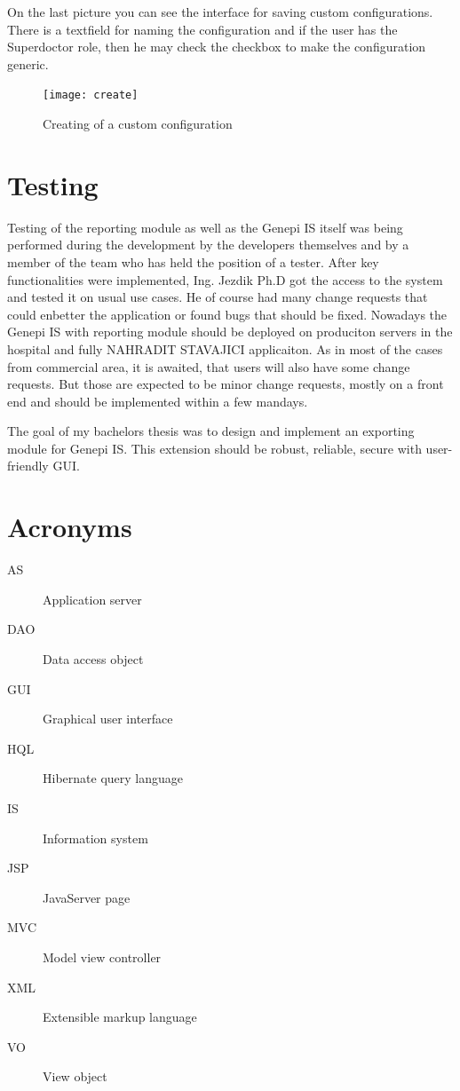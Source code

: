 \documentclass[thesis=B,english]{FITthesis}[2012/10/20]
\begin{document}
On the last picture you can see the interface for saving custom configurations. There is a textfield for naming the configuration and if the user has the Superdoctor role, then he may check the checkbox to make the configuration generic.


\begin{figure}[ht]\centering
\texttt{[image: create]}
		\caption{Creating of a custom configuration}
\end{figure}

\chapter{Testing}
Testing of the reporting module as well as the Genepi IS itself was being performed during the development by the developers themselves and by a member of the team who has held the position of a tester. After key  functionalities were implemented, Ing. Jezdik Ph.D got the access to the system and tested it on usual use cases. He of course had many change requests that could enbetter the application or found bugs that should be fixed. Nowadays the Genepi IS with reporting module should be deployed on produciton servers in the hospital and fully NAHRADIT STAVAJICI applicaiton. As in most of the cases from commercial area, it is awaited, that users will also have some change requests. But those are expected to be minor change requests, mostly on a front end and should be implemented within a few mandays.
\begin{conclusion}
The goal of my bachelors thesis was to design and implement an exporting module for Genepi IS. This extension should be robust, reliable, secure with user-friendly GUI. 
\end{conclusion}




\appendix

\chapter{Acronyms}
\begin{description}
	\item[AS] Application server
	\item[DAO] Data access object
	\item[GUI] Graphical user interface
	\item[HQL] Hibernate query language
	\item[IS] Information system
	\item[JSP] JavaServer page
	\item[MVC] Model view controller
	\item[XML] Extensible markup language
	\item[VO] View object
\end{description}
\end{document}
